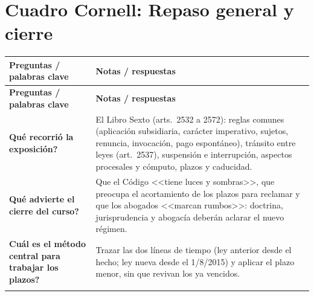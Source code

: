 \documentclass[12pt,oneside]{book}
\newenvironment{cornell}{%
  \par\medskip\noindent
  \begin{longtable}{>{\raggedright\arraybackslash}p{0.25\textwidth}>{\raggedright\arraybackslash}p{0.69\textwidth}}
  \toprule
  \textbf{Preguntas / palabras clave} & \textbf{Notas / respuestas} \\
  \midrule
  \endfirsthead
  \toprule
  \textbf{Preguntas / palabras clave} & \textbf{Notas / respuestas} \\
  \midrule
  \endhead
}{%
  \bottomrule
  \end{longtable}
}
\newcommand{\cq}[2]{\textbf{#1} & #2 \\ \addlinespace[0.5em]}
\newcommand{\cresumen}[1]{\midrule \multicolumn{2}{p{0.94\textwidth}}{\textbf{Resumen:} #1} \\}
\begin{document}
\section*{Cuadro Cornell: Repaso general y cierre}

\begin{cornell}
\cq{\textquestiondown Qu\'e recorri\'o la exposici\'on?}{El Libro Sexto (arts.\ 2532 a 2572): reglas comunes (aplicaci\'on subsidiaria, car\'acter imperativo, sujetos, renuncia, invocaci\'on, pago espont\'aneo), tr\'ansito entre leyes (art.\ 2537), suspensi\'on e interrupci\'on, aspectos procesales y c\'omputo, plazos y caducidad.}
\cq{\textquestiondown Qu\'e advierte el cierre del curso?}{Que el C\'odigo <<tiene luces y sombras>>, que preocupa el acortamiento de los plazos para reclamar y que los abogados <<marcan rumbos>>: doctrina, jurisprudencia y abogac\'ia deber\'an aclarar el nuevo r\'egimen.}
\cq{\textquestiondown Cu\'al es el m\'etodo central para trabajar los plazos?}{Trazar las dos l\'ineas de tiempo (ley anterior desde el hecho; ley nueva desde el 1/8/2015) y aplicar el plazo menor, sin que revivan los ya vencidos.}
\cresumen{La clase recorre el Libro Sexto del C\'odigo Civil y Comercial (arts.\ 2532 a 2572) y explica que el tiempo extingue acciones (prescripci\'on liberatoria) o derechos (caducidad). Primero fija las reglas comunes: el C\'odigo se aplica de manera subsidiaria, sus normas son imperativas, la prescripci\'on opera para todas las personas y puede ser invocada por cualquier interesado; solo se renuncia a la ya ganada y el pago de una deuda prescripta no se repite. Luego resuelve el problema pr\'actico de los plazos en curso al 1.\textordmasculine\ de agosto de 2015: se comparan dos l\'ineas de tiempo y prevalece el plazo menor, sin que revivan los ya vencidos. Despu\'es explica c\'omo se controla el reloj: la suspensi\'on lo pausa (interpelaci\'on fehaciente, mediaci\'on, casos especiales) y la interrupci\'on lo reinicia (reconocimiento, petici\'on judicial, arbitraje), con atenci\'on a causales que desaparecen, como la querella penal. En el proceso, la prescripci\'on se articula por acci\'on o excepci\'on, nunca de oficio, y en una oportunidad precisa. Finalmente, el plazo gen\'erico baja a cinco a\~nos, aparecen plazos especiales de tres, dos y diez a\~nos, y la caducidad extingue el derecho sin posibilidad de suspensi\'on ni interrupci\'on. El cierre advierte que el acortamiento de los plazos exige que los abogados cuenten con rigor, act\'uen a tiempo y orienten la interpretaci\'on de un C\'odigo con luces y sombras.}
\end{cornell}
\end{document}
